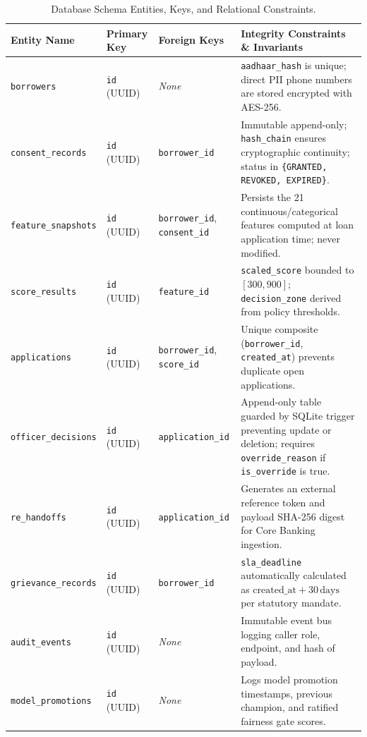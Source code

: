 \begin{table}[H]
\centering
\small
\renewcommand{\arraystretch}{1.15}
\begin{tabularx}{\textwidth}{l p{2.8cm} p{2.5cm} X}
  \toprule
  \textbf{Entity Name} & \textbf{Primary Key} & \textbf{Foreign Keys} & \textbf{Integrity Constraints \& Invariants} \\
  \midrule
  \texttt{borrowers} & \texttt{id} (UUID) & \textit{None} & \texttt{aadhaar\_hash} is unique; direct PII phone numbers are stored encrypted with AES-256. \\
  \texttt{consent\_records} & \texttt{id} (UUID) & \texttt{borrower\_id} & Immutable append-only; \texttt{hash\_chain} ensures cryptographic continuity; status in \texttt{\{GRANTED, REVOKED, EXPIRED\}}. \\
  \texttt{feature\_snapshots} & \texttt{id} (UUID) & \texttt{borrower\_id}, \texttt{consent\_id} & Persists the 21 continuous/categorical features computed at loan application time; never modified. \\
  \texttt{score\_results} & \texttt{id} (UUID) & \texttt{feature\_id} & \texttt{scaled\_score} bounded to $[300, 900]$; \texttt{decision\_zone} derived from policy thresholds. \\
  \texttt{applications} & \texttt{id} (UUID) & \texttt{borrower\_id}, \texttt{score\_id} & Unique composite (\texttt{borrower\_id}, \texttt{created\_at}) prevents duplicate open applications. \\
  \texttt{officer\_decisions} & \texttt{id} (UUID) & \texttt{application\_id} & Append-only table guarded by SQLite trigger preventing update or deletion; requires \texttt{override\_reason} if \texttt{is\_override} is true. \\
  \texttt{re\_handoffs} & \texttt{id} (UUID) & \texttt{application\_id} & Generates an external reference token and payload SHA-256 digest for Core Banking ingestion. \\
  \texttt{grievance\_records} & \texttt{id} (UUID) & \texttt{borrower\_id} & \texttt{sla\_deadline} automatically calculated as $\text{created\_at} + 30\,\text{days}$ per statutory mandate. \\
  \texttt{audit\_events} & \texttt{id} (UUID) & \textit{None} & Immutable event bus logging caller role, endpoint, and hash of payload. \\
  \texttt{model\_promotions} & \texttt{id} (UUID) & \textit{None} & Logs model promotion timestamps, previous champion, and ratified fairness gate scores. \\
  \bottomrule
\end{tabularx}
\caption{Database Schema Entities, Keys, and Relational Constraints.}
\label{tab:entities_overview}
\end{table}

